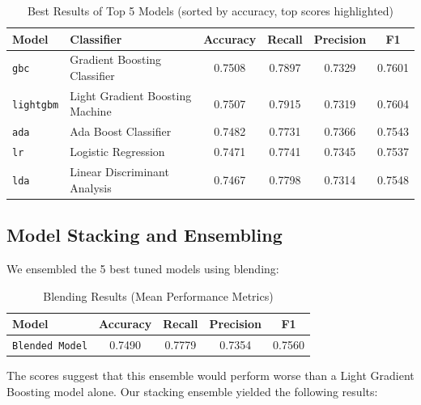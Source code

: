 \documentclass[a4paper,12pt]{article}
\begin{document}
\begin{table}[H]
\centering
\begin{tabular}{l l c c c c}
\toprule
\textbf{Model} & \textbf{Classifier} & \textbf{Accuracy} & \textbf{Recall} & \textbf{Precision} & \textbf{F1} \\
\midrule
\texttt{gbc}    & Gradient Boosting Classifier & 0.7508 & 0.7897 & 0.7329 & 0.7601 \\  %
\texttt{lightgbm} & Light Gradient Boosting Machine & 0.7507 & 0.7915 & 0.7319 & 0.7604 \\  %
\texttt{ada} & Ada Boost Classifier & 0.7482 & 0.7731 & \cellcolor{yellow}0.7366 & 0.7543 \\ %
\texttt{lr} & Logistic Regression & 0.7471 & 0.7741 & 0.7345 & 0.7537 \\  %
\texttt{lda} & Linear Discriminant Analysis & 0.7467 & 0.7798 & 0.7314 & 0.7548 \\ %
\bottomrule
\end{tabular}
\caption{Best Results of Top 5 Models (sorted by accuracy, top scores highlighted)}
\label{tab:best_model_performance}
\end{table}


\subsection{Model Stacking and Ensembling}

We ensembled the 5 best tuned models using blending:

\begin{table}[H]
    \centering
    \begin{tabular}{l c c c c}
    \toprule
    \textbf{Model} & \textbf{Accuracy} & \textbf{Recall} & \textbf{Precision} & \textbf{F1} \\
    \midrule
    \texttt{Blended Model} & 0.7490 & 0.7779 & 0.7354 & 0.7560 \\
    \bottomrule
    \end{tabular}
    \caption{Blending Results (Mean Performance Metrics)}
    \label{tab:blending_performance}
\end{table}

The scores suggest that this ensemble would perform worse than a Light Gradient Boosting model alone.
Our stacking ensemble yielded the following results:
\end{document}
